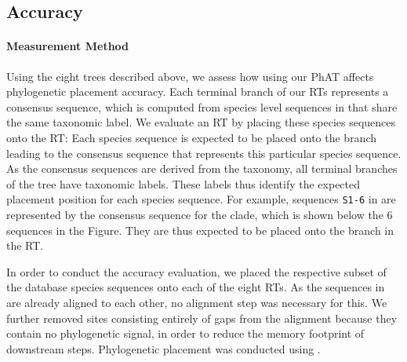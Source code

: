 
\subsection{Accuracy}
\label{ch:AutomaticTrees:sec:Evaluation:sub:Accuracy}

\paragraph{Measurement Method}
\label{ch:AutomaticTrees:sec:Evaluation:sub:Accuracy:par:MeasurementMethod}

Using the eight trees described above, we assess how using our \ac{PhAT} affects phylogenetic placement accuracy.
Each terminal branch of our \acp{RT} represents a consensus sequence,
which is computed from species level sequences in  that share the same taxonomic label.
We evaluate an \ac{RT} by placing these species sequences onto the \ac{RT}:
Each species sequence is expected to be placed onto the branch
leading to the consensus sequence that represents this particular species sequence.
As the consensus sequences are derived from the taxonomy, all terminal branches of the tree have taxonomic labels.
These labels thus identify the expected placement position for each species sequence.
For example, sequences \texttt{S1-6} in 
are represented by the consensus sequence for the  clade,
which is shown below the \num{6} sequences in the Figure.
They are thus expected to be placed onto the  branch in the \ac{RT}.

In order to conduct the accuracy evaluation,
we placed the respective subset of the  database species sequences onto each of the eight \acp{RT}.
As the sequences in  are already aligned to each other, no alignment step was necessary for this.
We further removed sites consisting entirely of gaps from the alignment because they contain no phylogenetic signal,
in order to reduce the memory footprint of downstream steps.
Phylogenetic placement was conducted using  \citep{Barbera2018}.

